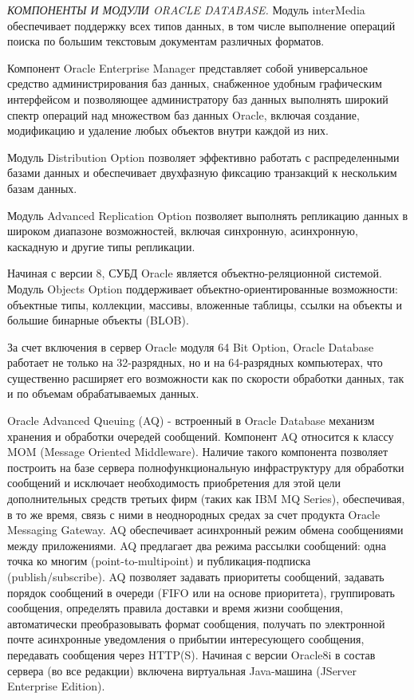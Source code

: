 \textit{КОМПОНЕНТЫ И МОДУЛИ ORACLE DATABASE.}
Модуль interMedia обеспечивает поддержку всех типов данных, в том числе выполнение операций поиска по большим текстовым документам различных форматов.

Компонент Oracle Enterprise Manager представляет собой универсальное средство администрирования баз данных, снабженное удобным графическим интерфейсом и позволяющее администратору баз данных выполнять широкий спектр операций над множеством баз данных Oracle, включая создание, модификацию и удаление любых объектов внутри каждой из них.

Модуль Distribution Option позволяет эффективно работать с распределенными базами данных и обеспечивает двухфазную фиксацию транзакций к нескольким базам данных.

Модуль Advanced Replication Option позволяет выполнять репликацию данных в широком диапазоне возможностей, включая синхронную, асинхронную, каскадную и другие типы репликации.

Начиная с версии 8, СУБД Oracle является объектно-реляционной системой. Модуль Objects Option поддерживает объектно-ориентированные возможности: объектные типы, коллекции, массивы, вложенные таблицы, ссылки на объекты и большие бинарные объекты (BLOB).

За счет включения в сервер Oracle модуля 64 Bit Option, Oracle Database работает не только на 32-разрядных, но и на 64-разрядных компьютерах, что существенно расширяет его возможности как по скорости обработки данных, так и по объемам обрабатываемых данных.

Oracle Advanced Queuing (AQ) - встроенный в Oracle Database механизм хранения и обработки очередей сообщений. Компонент AQ относится к классу MOM (Message Oriented Middleware). Наличие такого компонента позволяет построить на базе сервера полнофункциональную инфраструктуру для обработки сообщений и исключает необходимость приобретения для этой цели дополнительных средств третьих фирм (таких как IBM MQ Series), обеспечивая, в то же время, связь с ними в неоднородных средах за счет продукта Oracle Messaging Gateway. AQ обеспечивает асинхронный режим обмена сообщениями между приложениями. AQ предлагает два режима рассылки сообщений: одна точка ко многим (point-to-multipoint) и публикация-подписка (publish/subscribe). AQ позволяет задавать приоритеты сообщений, задавать порядок сообщений в очереди (FIFO или на основе приоритета), группировать сообщения, определять правила доставки и время жизни сообщения, автоматически преобразовывать формат сообщения, получать по электронной почте асинхронные уведомления о прибытии интересующего сообщения, передавать сообщения через HTTP(S). Начиная с версии Oracle8i в состав сервера (во все редакции) включена виртуальная Java-машина (JServer Enterprise Edition).

